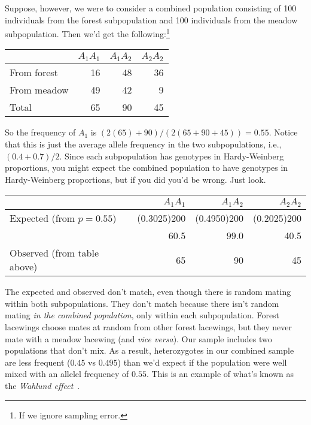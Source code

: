 Suppose, however, we were to consider a combined population consisting
of 100 individuals from the forest subpopulation and 100 individuals
from the meadow subpopulation. Then we'd get the
following:\footnote{If we ignore sampling error.}

\begin{center}
\begin{tabular}{l|rrr}
\hline\hline
       & $A_1A_1$ & $A_1A_2$ & $A_2A_2$ \\
\hline
From forest & 16  & 48       & 36 \\
From meadow & 49  & 42       & 9 \\
\hline
Total       & 65  & 90       & 45 \\
\hline
\end{tabular}
\end{center}
So the frequency of $A_1$ is $(2(65) + 90)/(2(65 + 90 + 45)) =
0.55$. Notice that this is just the average allele frequency in the
two subpopulations, i.e., $(0.4 + 0.7)/2$. Since each subpopulation has
genotypes in Hardy-Weinberg proportions, you might expect the combined
population to have genotypes in Hardy-Weinberg proportions, but if you did
you'd be wrong. Just look.

\begin{center}
\begin{tabular}{l|rrr}
\hline\hline
                            & $A_1A_1$ & $A_1A_2$ & $A_2A_2$ \\
\hline
Expected (from $p=0.55$)    & (0.3025)200 & (0.4950)200 & (0.2025)200 \\
                            & 60.5     & 99.0     & 40.5 \\
Observed (from table above) & 65       & 90       & 45 \\
\hline
\end{tabular}
\end{center}
The expected and observed don't match, even though there is random
mating within both subpopulations. They don't match because there
isn't random mating {\it in the combined population}, only within each
subpopulation. Forest lacewings choose mates at random from other
forest lacewings, but they never mate with a meadow lacewing (and {\it
  vice versa\/}). Our sample includes two populations that don't
mix. As a result, heterozygotes in our combined sample are less
frequent ($0.45$ vs $0.495$) than we'd expect if the population were
well mixed with an allelel frequency of $0.55$. This is an example of
what's known as the {\it Wahlund effect}~\cite{Wahlund-1928}.


